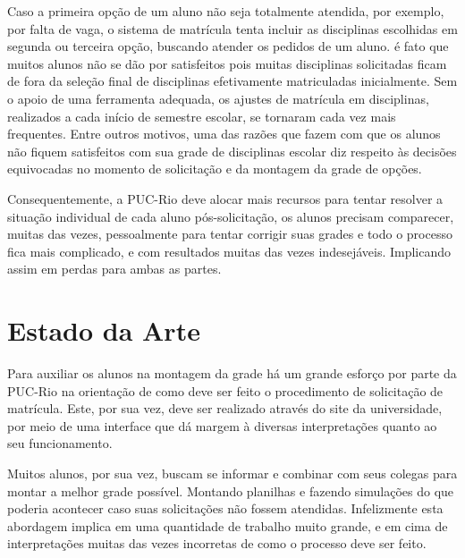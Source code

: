 \documentclass[graduacao,brazil]{ThesisPUC}
\begin{document}
Caso a primeira op\c{c}\~{a}o de um aluno n\~{a}o seja totalmente atendida, por exemplo, por falta de vaga, o sistema de matr\'{i}cula tenta incluir as disciplinas escolhidas em segunda ou terceira op\c{c}\~{a}o, buscando atender os pedidos de um aluno. \'{e} fato que muitos alunos n\~{a}o se d\~{a}o por satisfeitos pois muitas disciplinas solicitadas ficam de fora da sele\c{c}\~{a}o final de disciplinas efetivamente matriculadas inicialmente. Sem o apoio de uma ferramenta adequada, os ajustes de matr\'{i}cula em disciplinas, realizados a cada in\'{i}cio de semestre escolar, se tornaram cada vez mais frequentes. Entre outros motivos, uma das razões que fazem com que os alunos n\~{a}o fiquem satisfeitos com sua grade de disciplinas escolar diz respeito \`{a}s decisões equivocadas no momento de solicita\c{c}\~{a}o e da montagem da grade de op\c{c}ões.

Consequentemente, a PUC-Rio deve alocar mais recursos para tentar resolver a situa\c{c}\~{a}o individual de cada aluno p\'{o}s-solicita\c{c}\~{a}o, os alunos precisam comparecer, muitas das vezes, pessoalmente para tentar corrigir suas grades e todo o processo fica mais complicado, e com resultados muitas das vezes indesej\'{a}veis. Implicando assim em perdas para ambas as partes.



\chapter{Estado da Arte}

Para auxiliar os alunos na montagem da grade h\'{a} um grande esfor\c{c}o por parte da PUC-Rio na orienta\c{c}\~{a}o de como deve ser feito o procedimento de solicita\c{c}\~{a}o de matr\'{i}cula. Este, por sua vez, deve ser realizado atrav\'{e}s do site da universidade, por meio de uma interface que d\'{a} margem \`{a} diversas interpreta\c{c}ões quanto ao seu funcionamento.

Muitos alunos, por sua vez, buscam se informar e combinar com seus colegas para montar a melhor grade poss\'{i}vel. Montando planilhas e fazendo simula\c{c}ões do que poderia acontecer caso suas solicita\c{c}ões n\~{a}o fossem atendidas. Infelizmente esta abordagem implica em uma quantidade de trabalho muito grande, e em cima de interpreta\c{c}ões muitas das vezes incorretas de como o processo deve ser feito.
\end{document}
